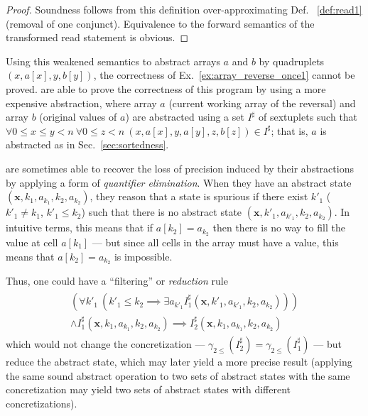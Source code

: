 \documentclass[a4paper]{article}
\newcommand{\ve}[1]{\mathbf{#1}}
\newcommand{\vx}{\ve{x}}
\newcommand{\abstr}[1]{#1^\sharp}
\newcommand{\concretization}[2][]{\gamma_{#1}\left(#2\right)}
\theoremstyle{definition}
\theoremstyle{plain}
\begin{document}
\begin{proof}
Soundness follows from this definition over-approximating Def.~
\ref{def:read1} (removal of one conjunct). Equivalence to the forward semantics of the transformed read statement is obvious.
\end{proof}

Using this weakened semantics to abstract arrays $a$ and $b$ by quadruplets $(x,a[x],y,b[y])$, the correctness of Ex.~\ref{ex:array_reverse_once1} cannot be proved.
\citet{Monniaux_Alberti_SAS2015} are able to prove the correctness of this program by using a more expensive abstraction, where array $a$ (current working array of the reversal) and array $b$ (original values of $a$) are abstracted using a set $\abstr{I}$ of sextuplets such that $\forall 0 \leq x \leq y < n~ \forall 0 \leq z < n ~ (x,a[x],y,a[y],z,b[z]) \in \abstr{I}$; that is, $a$ is abstracted as in Sec.~\ref{sec:sortedness}.

\citet[Sec.~5.5]{Monniaux_Alberti_SAS2015} are sometimes able to recover the loss of precision induced by their abstractions by applying a form of \emph{quantifier elimination}.
When they have an abstract state $(\vx, k_1, a_{k_1}, k_2, a_{k_2})$, they reason that a state is spurious if there exist $k'_1$ ($k'_1 \neq k_1$, $k'_1 \leq k_2$) such that there is no abstract state $(\vx, k'_1, a_{k'_1}, k_2, a_{k_2})$. In intuitive terms, this means that if $a[k_2] = a_{k_2}$ then there is no way to fill the value at cell $a[k_1]$ --- but since all cells in the array must have a value, this means that $a[k_2] = a_{k_2}$ is impossible.

Thus, one could have a ``filtering'' or \emph{reduction} rule
\begin{align}
\begin{aligned}
  \left(\forall k'_1~ \left(k'_1 \leq k_2 \implies \exists a_{k'_1} \abstr{I}_1(\vx, k'_1, a_{k'_1}, k_2, a_{k_2})\right) \right) \\ \land
  \abstr{I}_1(\vx, k_1, a_{k_1}, k_2, a_{k_2}) \implies
  \abstr{I}_2(\vx, k_1, a_{k_1}, k_2, a_{k_2})
\end{aligned}
\end{align}
which would not change the concretization --- $\concretization[2\leq]{\abstr{I}_2} = \concretization[2\leq]{\abstr{I}_1}$ --- but reduce the abstract state, which may later yield a more precise result (applying the same sound abstract operation to two sets of abstract states with the same concretization may yield two sets of abstract states with different concretizations).
\end{document}
